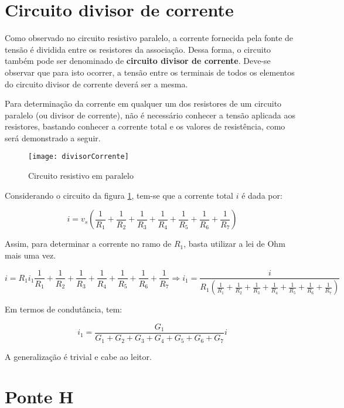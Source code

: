 \documentclass[12pt,fleqn]{book} %
\begin{document}
\section{Circuito divisor de corrente}

Como observado no circuito resistivo paralelo, a corrente fornecida pela fonte de tensão é dividida entre os resistores da associação. Dessa forma, o circuito também pode ser denominado de \textbf{circuito divisor de corrente}. Deve-se observar que para isto ocorrer, a tensão entre os terminais de todos os elementos do circuito divisor de corrente deverá ser a mesma.

Para determinação da corrente em qualquer um dos resistores de um circuito paralelo (ou divisor de corrente), não é necessário conhecer a tensão aplicada aos resistores, bastando conhecer a corrente total e os valores de resistência, como será demonstrado a seguir.

        \begin{figure}[!htbp] \centering\texttt{[image: divisorCorrente]}
            \caption{Circuito resistivo em paralelo}\label{divisorCorrente} 
        \end{figure}

Considerando o circuito da figura \ref{divisorCorrente}, tem-se que a corrente total $i$ é dada por:

\begin{equation}
i= v_s(\frac{1}{R_1} + \frac{1}{R_2} +\frac{1}{R_3} +\frac{1}{R_4} +\frac{1}{R_5} +\frac{1}{R_6} +\frac{1}{R_7})
\end{equation}

Assim, para determinar a corrente no ramo de $R_1$, basta utilizar a lei de Ohm mais uma vez.

\begin{equation}
i = R_1i_1\frac{1}{R_1} + \frac{1}{R_2} +\frac{1}{R_3} +\frac{1}{R_4} +\frac{1}{R_5} +\frac{1}{R_6} +\frac{1}{R_7} \Rightarrow i_1 = \frac{i}{R_1(\frac{1}{R_1} + \frac{1}{R_2} +\frac{1}{R_3} +\frac{1}{R_4} +\frac{1}{R_5} +\frac{1}{R_6} +\frac{1}{R_7})}
\end{equation}

Em termos de condutância, tem:

\begin{equation}
i_1 = \frac{G_1}{G_1 + G_2 + G_3 + G_4 + G_5 + G_6 + G_7}i
\end{equation}

A generalização é trivial e cabe ao leitor.

\section{Ponte H}
\end{document}
